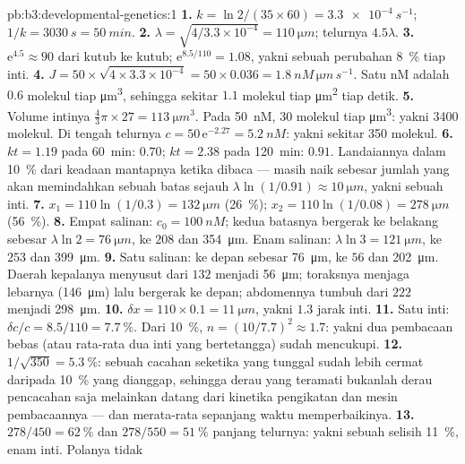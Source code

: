 \begin{solution}{pb:b3:developmental-genetics:1}
\textbf{1.} $k = \ln 2/(35\times 60) = \qty{3.3e-4}{s^{-1}}$; $1/k =
\qty{3030}{s} = \qty{50}{min}$.
\textbf{2.} $\lambda = \sqrt{4/3.3\times 10^{-4}} = \qty{110}{\micro m}$;
telurnya $4.5\lambda$.
\textbf{3.} $\mathrm{e}^{4.5} \approx 90$ dari kutub ke kutub;
$\mathrm{e}^{8.5/110} = 1.08$, yakni sebuah perubahan \qty{8}{\%} tiap inti.
\textbf{4.} $J = 50\times\sqrt{4\times 3.3\times 10^{-4}} = 50\times
0.036 = \qty{1.8}{nM\,\micro m\,s^{-1}}$. Satu nM adalah $0.6$ molekul
tiap \unit{\micro m^3}, sehingga sekitar $1.1$ molekul tiap \unit{\micro m^2}
tiap detik.
\textbf{5.} Volume intinya $\tfrac{4}{3}\pi\times 27 = \qty{113}{\micro
m^3}$. Pada \qty{50}{nM}, $30$ molekul tiap \unit{\micro m^3}:
yakni \num{3400} molekul. Di tengah telurnya $c = 50\,\mathrm{e}^{-2.27} =
\qty{5.2}{nM}$: yakni sekitar \num{350} molekul.
\textbf{6.} $kt = 1.19$ pada \qty{60}{min}: $0.70$; $kt = 2.38$ pada
\qty{120}{min}: $0.91$. Landaiannya dalam \qty{10}{\%} dari keadaan mantapnya
ketika dibaca --- masih naik sebesar jumlah yang akan memindahkan sebuah batas sejauh
$\lambda\ln(1/0.91) \approx \qty{10}{\micro m}$, yakni sebuah inti.
\textbf{7.} $x_{1} = 110\ln(1/0.3) = \qty{132}{\micro m}$
(\qty{26}{\%}); $x_{2} = 110\ln(1/0.08) = \qty{278}{\micro m}$
(\qty{56}{\%}).
\textbf{8.} Empat salinan: $c_{0} = \qty{100}{nM}$; kedua batasnya bergerak
ke belakang sebesar $\lambda\ln 2 = \qty{76}{\micro m}$, ke $208$ dan
\qty{354}{\micro m}. Enam salinan: $\lambda\ln 3 = \qty{121}{\micro m}$,
ke $253$ dan \qty{399}{\micro m}.
\textbf{9.} Satu salinan: ke depan sebesar \qty{76}{\micro m}, ke $56$ dan
\qty{202}{\micro m}. Daerah kepalanya menyusut dari $132$ menjadi
\qty{56}{\micro m}; toraksnya menjaga lebarnya (\qty{146}{\micro m}) lalu
bergerak ke depan; abdomennya tumbuh dari $222$ menjadi \qty{298}{\micro m}.
\textbf{10.} $\delta x = 110\times 0.1 = \qty{11}{\micro m}$, yakni $1.3$
jarak inti.
\textbf{11.} Satu inti: $\delta c/c = 8.5/110 = \qty{7.7}{\%}$. Dari
\qty{10}{\%}, $n = (10/7.7)^{2} \approx 1.7$: yakni dua pembacaan bebas
(atau rata-rata dua inti yang bertetangga) sudah mencukupi.
\textbf{12.} $1/\sqrt{350} = \qty{5.3}{\%}$: sebuah cacahan seketika yang tunggal
sudah lebih cermat daripada \qty{10}{\%} yang dianggap, sehingga derau
yang teramati bukanlah derau pencacahan saja melainkan datang dari kinetika
pengikatan dan mesin pembacaannya --- dan merata-rata sepanjang waktu
memperbaikinya.
\textbf{13.} $278/450 = \qty{62}{\%}$ dan $278/550 = \qty{51}{\%}$ panjang
telurnya: yakni sebuah selisih \qty{11}{\%}, enam inti. Polanya tidak

\end{solution}
